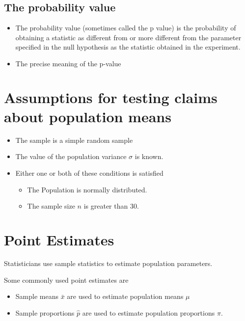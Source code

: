 \subsection{The probability value }
\begin{itemize}
\item The probability value (sometimes called the p value) is the probability of obtaining a statistic as different from or more different from the parameter specified in the null hypothesis as the statistic obtained in the experiment. 
\item The precise meaning of the p-value
\end{itemize}


\section{Assumptions for testing claims about population means}
{
\begin{itemize}
\item The sample is a simple random sample
\item The value of the population variance $\sigma$ is known.
\item Either one or both of these conditions is satisfied
\begin{itemize}
\item The Population is normally distributed.
\item The sample size $n$ is greater than 30.
\end{itemize}
\end{itemize}
}


\section{Point Estimates}

Statisticians use sample statistics to estimate population parameters. 

Some commonly used point estimates are
\begin{itemize}
\item Sample means $\bar{x}$ are used to estimate population means $\mu$
\item Sample proportions $\hat{p}$ are used to estimate population proportions $\pi$.
\end{itemize}




